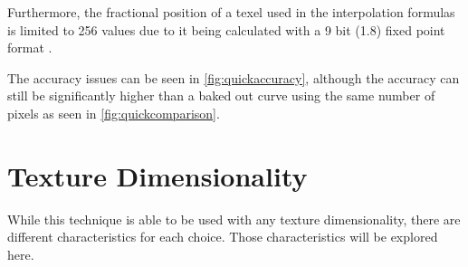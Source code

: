 \documentclass{jcgt}
\begin{document}
Furthermore, the fractional position of a texel used in the interpolation formulas is limited to 256 values due to it being calculated with a 9 bit (1.8) fixed point format \cite{NVIDIA}.

The accuracy issues can be seen in \autoref{fig:quickaccuracy}, although the accuracy can still be significantly higher than a baked out curve using the same number of pixels as seen in \autoref{fig:quickcomparison}.

\section{Texture Dimensionality}
\label{sec:texturedimensionality}

While this technique is able to be used with any texture dimensionality, there are different characteristics for each choice.  Those characteristics will be explored here.

\newcommand*\circled[1]{\tikz[baseline=(char.base)]{
            \node[shape=circle,draw] (char) {#1};}}
\end{document}

